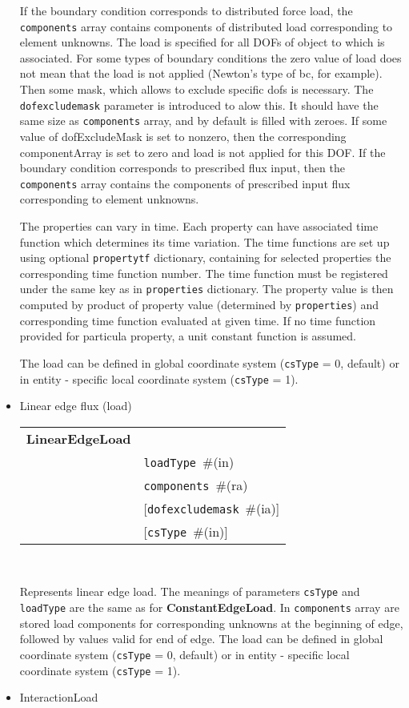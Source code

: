 \documentclass[a4paper]{article}
\newcommand{\param}[1]{\texttt{#1}} %
\newcommand{\optional}[1]{[#1]} %
\newcommand{\field}[2]{\param{#1}~\#{\tiny(#2)}} %
\newcommand{\optField}[2]{\optional{\field{#1}{#2}}}
\newcommand{\entKeywordInst}[1]{\textbf{#1}} %
\newenvironment{record}[1][]{\begin{tabular}{|ll}}{\end{tabular}\\}
\newcommand{\recentry}[2]{{#1}&{#2}\\}
\newcounter{rcc}
\newenvironment{record}[1][\textwidth]{\setcounter{rcc}{0}\rowcolors{1}{lightgray}{lightgray}\tabularx{#1}{llR} \hline}
               {\endtabularx}
\newcommand{\recentry}[2]{\ifthenelse{\value{rcc}>0}{$\backslash$ \\}{\setcounter{rcc}{1}}{#1}&{#2}&}
\begin{document}
\begin{itemize}
If the boundary condition corresponds to distributed force load, the \param{components} array contains components of distributed load corresponding to element unknowns.
The load is specified for all DOFs of object to which is associated.
For some types of boundary conditions the zero value of load does not mean that the load is not applied (Newton's type of bc, for example).
Then some mask, which allows to exclude specific dofs is necessary.
The \param{dofexcludemask} parameter is introduced to alow this.
It should have the same size as \param{components} array, and by
default is filled with zeroes. If some value of dofExcludeMask is set
to nonzero, then the corresponding componentArray
is set to zero and load is not applied for this DOF.
If the boundary condition corresponds to prescribed flux input, then
the \param{components} array contains the components of prescribed
input flux corresponding to element unknowns.

The properties can vary in time. Each property can have associated time function which determines its time variation. The time functions are set up using optional \param{propertytf} dictionary, containing for selected properties the corresponding time function number. The time function must be registered under the same key as in \param{properties} dictionary. The property value is then computed by product of property value (determined by \param{properties}) and corresponding time function evaluated at given time. If no time function provided for particula property, a unit constant function is assumed.

The load can be defined in global coordinate system (\param{csType} =
0, default) or in entity - specific local coordinate system
(\param{csType} = 1).
\item Linear edge flux (load)

\begin{record}[0.9\textwidth]
  \recentry{\entKeywordInst{LinearEdgeLoad}}{}
  \recentry{}{\field{loadType}{in}}
  \recentry{}{\field{components}{ra}}
  \recentry{}{\optField{dofexcludemask}{ia}}
  \recentry{}{\optField{csType}{in}}
\end{record}

Represents linear edge load. The meanings of parameters \param{csType} and \param{loadType} are the same as for
\entKeywordInst{ConstantEdgeLoad}.
In \param{components} array are stored load components for corresponding unknowns at the
beginning of edge, followed by values valid for end of edge.
The load can be defined in global coordinate system (\param{csType} = 0, default) or in entity - specific local coordinate system
(\param{csType} = 1).
\item InteractionLoad


\end{itemize}
\end{document}
